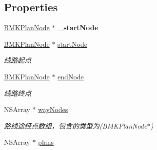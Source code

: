 \subsection*{Properties}
\begin{DoxyCompactItemize}
\item 
\hypertarget{interface_b_m_k_plan_result_aa530b079304cbdb5a90d8d8e6eac86bc}{\hyperlink{interface_b_m_k_plan_node}{B\-M\-K\-Plan\-Node} $\ast$ {\bfseries \-\_\-start\-Node}}\label{interface_b_m_k_plan_result_aa530b079304cbdb5a90d8d8e6eac86bc}

\item 
\hypertarget{interface_b_m_k_plan_result_aa5e9caa3f38b8e60524848cd55440037}{\hyperlink{interface_b_m_k_plan_node}{B\-M\-K\-Plan\-Node} $\ast$ \hyperlink{interface_b_m_k_plan_result_aa5e9caa3f38b8e60524848cd55440037}{start\-Node}}\label{interface_b_m_k_plan_result_aa5e9caa3f38b8e60524848cd55440037}

\begin{DoxyCompactList}\small\item\em 线路起点 \end{DoxyCompactList}\item 
\hypertarget{interface_b_m_k_plan_result_a1fc0259719623cea6d79f7f5d1b03c78}{\hyperlink{interface_b_m_k_plan_node}{B\-M\-K\-Plan\-Node} $\ast$ \hyperlink{interface_b_m_k_plan_result_a1fc0259719623cea6d79f7f5d1b03c78}{end\-Node}}\label{interface_b_m_k_plan_result_a1fc0259719623cea6d79f7f5d1b03c78}

\begin{DoxyCompactList}\small\item\em 线路终点 \end{DoxyCompactList}\item 
\hypertarget{interface_b_m_k_plan_result_ac466beab9bb1db4ddb1375d588eee45a}{N\-S\-Array $\ast$ \hyperlink{interface_b_m_k_plan_result_ac466beab9bb1db4ddb1375d588eee45a}{way\-Nodes}}\label{interface_b_m_k_plan_result_ac466beab9bb1db4ddb1375d588eee45a}

\begin{DoxyCompactList}\small\item\em 路线途经点数组，包含的类型为(\-B\-M\-K\-Plan\-Node$\ast$) \end{DoxyCompactList}\item 
\hypertarget{interface_b_m_k_plan_result_a7200e21cfce75d49d825722fc42074e1}{N\-S\-Array $\ast$ \hyperlink{interface_b_m_k_plan_result_a7200e21cfce75d49d825722fc42074e1}{plans}}\label{interface_b_m_k_plan_result_a7200e21cfce75d49d825722fc42074e1}


\end{DoxyCompactItemize}
